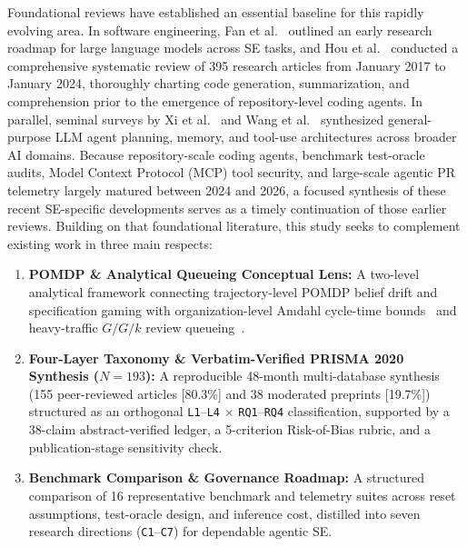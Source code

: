 \documentclass[10pt,twocolumn,a4paper]{article}
\makeatletter
\renewcommand\section{\@startsection{section}{1}{\z@}{-2.8ex \@plus -0.6ex \@minus -0.2ex}{1.4ex \@plus 0.2ex}{\normalfont\Large\bfseries\raggedright}}
\makeatother
\begin{document}
Foundational reviews have established an essential baseline for this rapidly evolving area. In software engineering, Fan et al.~\cite{fan2023large} outlined an early research roadmap for large language models across SE tasks, and Hou et al.~\cite{hou2024large} conducted a comprehensive systematic review of 395 research articles from January 2017 to January 2024, thoroughly charting code generation, summarization, and comprehension prior to the emergence of repository-level coding agents. In parallel, seminal surveys by Xi et al.~\cite{xi2023rise} and Wang et al.~\cite{wang2024survey} synthesized general-purpose LLM agent planning, memory, and tool-use architectures across broader AI domains. Because repository-scale coding agents, benchmark test-oracle audits, Model Context Protocol (MCP) tool security, and large-scale agentic PR telemetry largely matured between 2024 and 2026, a focused synthesis of these recent SE-specific developments serves as a timely continuation of those earlier reviews. Building on that foundational literature, this study seeks to complement existing work in three main respects:
\begin{enumerate}[leftmargin=*,nosep]
    \item \textbf{POMDP \& Analytical Queueing Conceptual Lens:} A two-level analytical framework connecting trajectory-level POMDP belief drift and specification gaming with organization-level Amdahl cycle-time bounds~\cite{amdahl1967validity} and heavy-traffic $G/G/k$ review queueing~\cite{kingman1961single,sakasegawa1977approximation}.
    \item \textbf{Four-Layer Taxonomy \& Verbatim-Verified PRISMA 2020 Synthesis ($N=193$):} A reproducible 48-month multi-database synthesis (155 peer-reviewed articles [80.3\%] and 38 moderated preprints [19.7\%]) structured as an orthogonal \texttt{L1}--\texttt{L4} $\times$ \texttt{RQ1}--\texttt{RQ4} classification, supported by a 38-claim abstract-verified ledger, a 5-criterion Risk-of-Bias rubric, and a publication-stage sensitivity check.
    \item \textbf{Benchmark Comparison \& Governance Roadmap:} A structured comparison of 16 representative benchmark and telemetry suites across reset assumptions, test-oracle design, and inference cost, distilled into seven research directions (\texttt{C1}--\texttt{C7}) for dependable agentic SE.
\end{enumerate}

\section{Background and Analytical Framework}
\label{sec:background}
\end{document}
